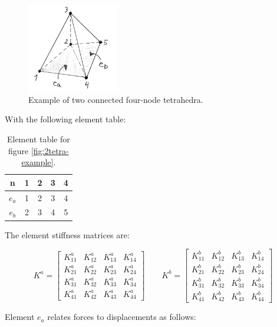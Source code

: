 \begin{figure}
  \centering
  \includegraphics[width=4cm]{./images/finite_element_method_two_tetrahedrons.png}
\caption{Example of two connected four-node tetrahedra.}
\label{fig:2tetra-example}
\end{figure}

With the following element table:

\begin{table}
  \centering
\begin{tabular}{c|c|c|c|c|}
n & 1 & 2 & 3 & 4 \\
\hline
$e_a$ & 1 & 2 & 3 & 4 \\
$e_b$ & 2 & 3 & 4 & 5 \\
\hline
\end{tabular}
\caption{Element table for figure \vref{fig:2tetra-example}.}
\label{table:element-table-for-example}
\end{table}

The element stiffness matrices are:

\begin{equation}
K^a =
\begin{bmatrix}
K^a_{11} & K^a_{12} & K^a_{13} & K^a_{14} \\
K^a_{21} & K^a_{22} & K^a_{23} & K^a_{24} \\
K^a_{31} & K^a_{32} & K^a_{33} & K^a_{34} \\
K^a_{41} & K^a_{42} & K^a_{43} & K^a_{44}
\end{bmatrix}
\qquad
K^b =
\begin{bmatrix}
K^b_{11} & K^b_{12} & K^b_{13} & K^b_{14} \\
K^b_{21} & K^b_{22} & K^b_{23} & K^b_{24} \\
K^b_{31} & K^b_{32} & K^b_{33} & K^b_{34} \\
K^b_{41} & K^b_{42} & K^b_{43} & K^b_{44}
\end{bmatrix}
\end{equation}

Element $e_a$ relates forces to displacements as follows:

